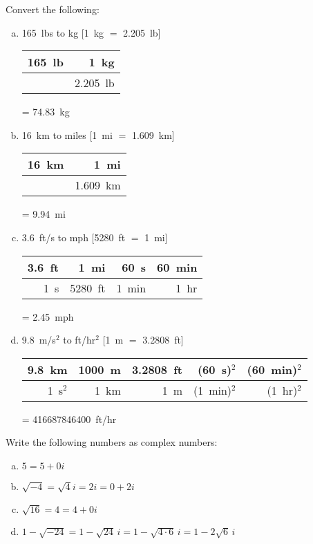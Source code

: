 \documentclass[11pt,letterpaper]{article}
\begin{document}
 Convert the following:
\begin{enumerate}[(a)]
\item 165~lbs to kg [1~kg $=$ 2.205~lb]
	\begin{table}[!ht]
	\centering
	\begin{tabular}{r|r}
	165~lb & 1~kg  \\ \hline
	& 2.205~lb 
	\end{tabular}
	= 74.83~kg
	\end{table} \vfill

\item 16~km to miles [1~mi $=$ 1.609~km] 
	\begin{table}[!ht]
	\centering
	\begin{tabular}{r|r}
	16~km & 1~mi \\ \hline
	& 1.609~km
	\end{tabular}
	= 9.94~mi
	\end{table} \vfill

\item 3.6~ft/s to mph [5280~ft $=$ 1~mi] 
	\begin{table}[!ht]
	\centering
	\begin{tabular}{r|r|r|r}
	3.6~ft & 1~mi & 60~s & 60~min\\ \hline
	1~s & 5280~ft & 1~min & 1~hr
	\end{tabular}
	= 2.45~mph
	\end{table} \vfill

\item 9.8~m/s$^2$ to ft/hr$^2$ [1~m $=$ 3.2808~ft] 
	\begin{table}[!ht]
	\centering
	\begin{tabular}{r|r|r|r|r}
	9.8~km & 1000~m & 3.2808~ft & (60~s)$^2$ & (60~min)$^2$ \\ \hline
	1~s$^2$ & 1~km & 1~m &  (1~min)$^2$ & (1~hr)$^2$
	\end{tabular}
	= 416687846400~ft/hr
	\end{table} \vfill
\end{enumerate}





\newpage





 Write the following numbers as complex numbers:
\begin{enumerate}[(a)]
\item $5= 5 + 0i$ \vfill
\item $\sqrt{-4}= \sqrt{4}i= 2i= 0 + 2i$ \vfill
\item $\sqrt{16}= 4= 4 + 0i$ \vfill
\item $1 - \sqrt{-24}= 1 - \sqrt{24}\,i= 1 - \sqrt{4 \cdot 6}\,i= 1 - 2\sqrt{6}\,i$ \vfill
\end{enumerate}
\end{document}
